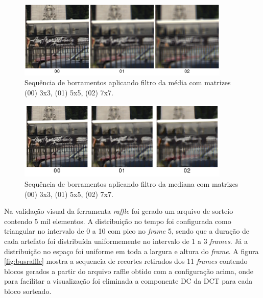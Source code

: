 \begin{figure}[!htb]
	\centering
	\includegraphics[width=0.9\textwidth]{./imgs/bluraverage.png}
	\caption[Sequência de borramentos aplicando filtro da média]{Sequência de borramentos aplicando filtro da média com matrizes (00) 3x3, (01) 5x5, (02) 7x7.}
	\label{fig:bluraverage}
\end{figure}

\begin{figure}[!htb]
	\centering
	\includegraphics[width=0.9\textwidth]{./imgs/blurmedian.png}
	\caption[Sequência de borramentos aplicando filtro da mediana]{Sequência de borramentos aplicando filtro da mediana com matrizes (00) 3x3, (01) 5x5, (02) 7x7.}
	\label{fig:blurmedian}
\end{figure}

Na validação visual da ferramenta \emph{raffle} foi gerado um arquivo de sorteio contendo 5 mil elementos.
A distribuição no tempo foi configurada como triangular no intervalo de 0 a 10 com pico no \emph{frame} 5, sendo que a duração de cada artefato foi distribuída uniformemente no intervalo de 1 a 3 \emph{frames}.
Já a distribuição no espaço foi uniforme em toda a largura e altura do \emph{frame}. 
A figura \ref{fig:busraffle} mostra a sequencia de recortes retirados dos 11 \emph{frames} contendo blocos gerados a partir do arquivo raffle obtido com a configuração acima, onde para facilitar a visualização foi eliminada a componente DC da DCT para cada bloco sorteado.

